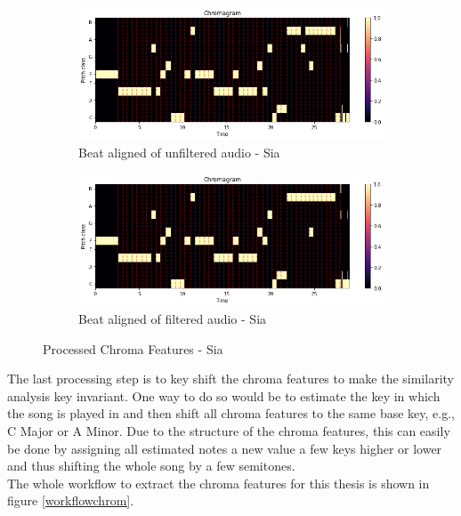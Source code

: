 \begin{figure}[htbp]
{{			\begin{subfigure}{.495\textwidth}
				\centering    
				\includegraphics[scale=0.3]{Images/Chroma/siaunfiltered.png}
				\caption{Beat aligned of unfiltered audio - Sia}
				\label{siaub}
			\end{subfigure}
			\begin{subfigure}{.495\textwidth}
				\centering     
				\includegraphics[scale=0.3]{Images/Chroma/siafiltered.png}
				\caption{Beat aligned of filtered audio - Sia}
				\label{siafb}
			\end{subfigure}%
	}}
	\caption{Processed Chroma Features - Sia}
	\label{beataligned}
\end{figure}
The last processing step is to key shift the chroma features to make the similarity analysis key invariant. One way to do so would be to estimate the key in which the song is played in and then shift all chroma features to the same base key, e.g., C Major or A Minor. Due to the structure of the chroma features, this can easily be done by assigning all estimated notes a new value a few keys higher or lower and thus shifting the whole song by a few semitones.\\
The whole workflow to extract the chroma features for this thesis is shown in figure \ref{workflowchrom}.
\begin{figure}[htbp]
	\centering
\end{figure}
